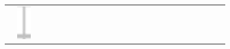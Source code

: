 \documentclass[10pt]{article}
\begin{document}
\begin{center}
\begin{tabular}{|c|c|c|c|c|c|c|c|c|c|c|c|c|c|c|c|c|c|c|c|c|c|c|c|c|}
 & \includegraphics[max width=\textwidth]{2024_11_21_ba65d61981011633d840g-05}

\end{tabular}
\end{center}
\end{document}
